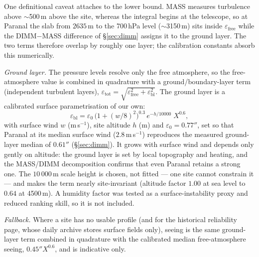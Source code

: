 \documentclass[11pt]{article}
\begin{document}
One definitional caveat attaches to the lower bound. MASS measures turbulence above
$\sim$500\,m above the site, whereas the integral begins at the telescope, so at
Paranal the slab from $2635$\,m to the 700\,hPa level ($\sim$3150\,m) sits inside
$\varepsilon_{\text{free}}$ while the DIMM$-$MASS difference of \S\ref{sec:dimm}
assigns it to the ground layer. The two terms therefore overlap by roughly one layer;
the calibration constants absorb this numerically.

\emph{Ground layer.} The pressure levels resolve only the free atmosphere, so the
free-atmosphere value is combined in quadrature with a ground/boundary-layer term
(independent turbulent layers),
$\varepsilon_{\text{tot}} = \sqrt{\varepsilon_{\text{free}}^2 +
\varepsilon_{\text{bl}}^2}$. The ground layer is a calibrated surface
parametrisation of our own:
\[
\varepsilon_{\text{bl}} = \varepsilon_0\,
\big(1 + (w/8)^2\big)^{0.3}\,
e^{-h/10000}\; X^{0.6},
\]
with surface wind $w$ (m\,s$^{-1}$), site altitude $h$ (m) and $\varepsilon_0 =
0.77''$, set so that Paranal at its median surface wind ($2.8$\,m\,s$^{-1}$)
reproduces the measured ground-layer median of $0.61''$ (\S\ref{sec:dimm}). It grows
with surface wind and depends only gently on altitude: the ground layer is set by
local topography and heating, and the MASS/DIMM decomposition confirms that even
Paranal retains a strong one. The $10\,000$\,m scale height is chosen, not fitted ---
one site cannot constrain it --- and makes the term nearly site-invariant (altitude
factor $1.00$ at sea level to $0.64$ at 4500\,m). A humidity factor was tested as a
surface-instability proxy and reduced ranking skill, so it is not included.

\emph{Fallback.} Where a site has no usable profile (and for the historical
reliability page, whose daily archive stores surface fields only), seeing is the same
ground-layer term combined in quadrature with the calibrated median free-atmosphere
seeing, $0.45''X^{0.6}$, and is indicative only.
\end{document}
